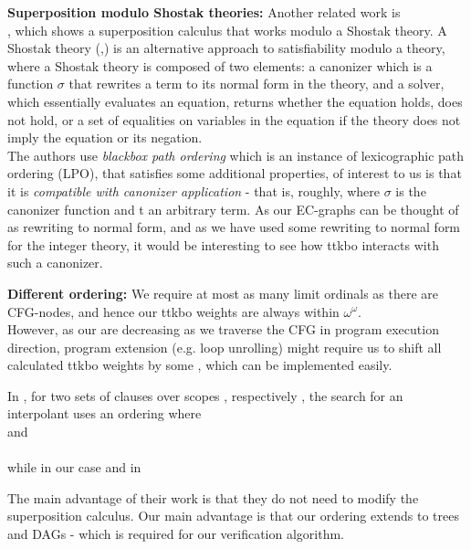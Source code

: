 \textbf{Superposition modulo Shostak theories:} Another related work is \\
\cite{SuperpositionModuloShostak}, which shows a superposition calculus that works modulo a Shostak theory. 
A Shostak theory (\cite{Shostak84},\cite{DBLP:conf/frocos/BarrettDS02}) is an alternative approach to satisfiability modulo a theory, where a Shostak theory is composed of two elements: a canonizer which is a function $\sigma$ that rewrites a term to its normal form in the theory, and a solver, which essentially evaluates an equation,
returns whether the equation holds, does not hold, or a set of equalities on variables in the equation if the theory does not imply the equation or its negation. \\
The authors use \emph{blackbox path ordering} which is an instance of lexicographic path ordering (LPO),
that satisfies some additional properties, of  interest to us is that it is \emph{compatible with canonizer application} - that is, roughly, 
 where $\sigma$ is the canonizer function and t an arbitrary term. As our EC-graphs can be thought of as rewriting to normal form, and as we have used some rewriting to normal form for the integer theory, it would be interesting to see how ttkbo interacts with such a canonizer. 

\textbf{Different ordering:} 
We require at most as many limit ordinals as there are CFG-nodes, and hence our ttkbo weights are always within $\omega^{\omega}$.\\
However, as our  are decreasing as we traverse the CFG in program execution direction, 
program extension (e.g. loop unrolling) might require us to shift all calculated ttkbo weights by some , which can be implemented easily.

In \cite{KovacsVoronkov09}, for two sets of clauses  over scopes \langt,\langb{} respectively ,
the search for an interpolant uses an ordering where \\
\m{\langtp \succsep \langI} and \\
\m{\langbp \succsep \langI} \\
while in our case and in \cite{McMillan08} \\
\m{\langtp \succsep \langI \succsep \langbp}

The main advantage of their work is that they do not need to modify the superposition calculus. 
Our main advantage is that our ordering extends to trees and DAGs - which is required for our verification algorithm.

